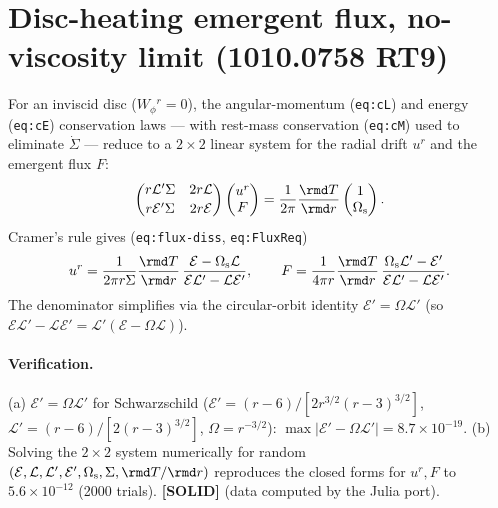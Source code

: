 \documentclass{article}
\begin{document}
\section*{Disc-heating emergent flux, no-viscosity limit (1010.0758 RT9)}

For an inviscid disc ($W_\phi{}^r=0$), the angular-momentum (\texttt{eq:cL}) and energy (\texttt{eq:cE})
conservation laws — with rest-mass conservation (\texttt{eq:cM}) used to eliminate $\dot\Sigma$ — reduce to a
$2\times2$ linear system for the radial drift $u^r$ and the emergent flux $F$:
\begin{equation}
  \begin{pmatrix} r\mathcal{L}'\Sigma & 2r\mathcal{L}\\[2pt] r\mathcal{E}'\Sigma & 2r\mathcal{E}\end{pmatrix}
  \begin{pmatrix} u^r\\ F\end{pmatrix}
  = \frac{1}{2\pi}\frac{\rmd T}{\rmd r}\begin{pmatrix} 1\\ \Omega_{\rm s}\end{pmatrix}.
\end{equation}
Cramer's rule gives (\texttt{eq:flux-diss}, \texttt{eq:FluxReq})
\begin{equation}
  u^r=\frac{1}{2\pi r\Sigma}\frac{\rmd T}{\rmd r}\,\frac{\mathcal{E}-\Omega_{\rm s}\mathcal{L}}
       {\mathcal{E}\mathcal{L}'-\mathcal{L}\mathcal{E}'},
  \qquad
  F=\frac{1}{4\pi r}\frac{\rmd T}{\rmd r}\,\frac{\Omega_{\rm s}\mathcal{L}'-\mathcal{E}'}
       {\mathcal{E}\mathcal{L}'-\mathcal{L}\mathcal{E}'} .
\end{equation}
The denominator simplifies via the circular-orbit identity $\mathcal{E}'=\Omega\mathcal{L}'$ (so
$\mathcal{E}\mathcal{L}'-\mathcal{L}\mathcal{E}'=\mathcal{L}'(\mathcal{E}-\Omega\mathcal{L})$).

\paragraph{Verification.}
(a) $\mathcal{E}'=\Omega\mathcal{L}'$ for Schwarzschild ($\mathcal{E}'=(r-6)/[2r^{3/2}(r-3)^{3/2}]$,
$\mathcal{L}'=(r-6)/[2(r-3)^{3/2}]$, $\Omega=r^{-3/2}$): $\max|\mathcal{E}'-\Omega\mathcal{L}'|=8.7\times10^{-19}$.
(b) Solving the $2\times2$ system numerically for random $(\mathcal{E},\mathcal{L},\mathcal{L}',\mathcal{E}',
\Omega_{\rm s},\Sigma,\rmd T/\rmd r)$ reproduces the closed forms for $u^r,F$ to $5.6\times10^{-12}$ (2000
trials). \textbf{[SOLID]} (data computed by the Julia port).
\end{document}
